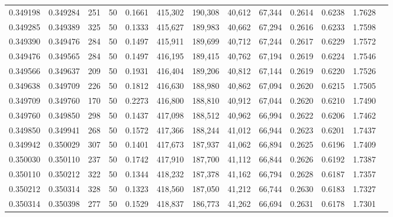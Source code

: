 \begin{tabular}{rrrrrrrrrrrrr}
0.349198 & 0.349284 &   251 &  50 &                                     0.1661 & 415,302 & 190,308 &  40,612 &  67,344 & 0.2614 & 0.6238 & 1.7628 \\
0.349285 & 0.349389 &   325 &  50 &                                     0.1333 & 415,627 & 189,983 &  40,662 &  67,294 & 0.2616 & 0.6233 & 1.7598 \\
0.349390 & 0.349476 &   284 &  50 &                                     0.1497 & 415,911 & 189,699 &  40,712 &  67,244 & 0.2617 & 0.6229 & 1.7572 \\
0.349476 & 0.349565 &   284 &  50 &                                     0.1497 & 416,195 & 189,415 &  40,762 &  67,194 & 0.2619 & 0.6224 & 1.7546 \\
0.349566 & 0.349637 &   209 &  50 &                                     0.1931 & 416,404 & 189,206 &  40,812 &  67,144 & 0.2619 & 0.6220 & 1.7526 \\
0.349638 & 0.349709 &   226 &  50 &                                     0.1812 & 416,630 & 188,980 &  40,862 &  67,094 & 0.2620 & 0.6215 & 1.7505 \\
0.349709 & 0.349760 &   170 &  50 &                                     0.2273 & 416,800 & 188,810 &  40,912 &  67,044 & 0.2620 & 0.6210 & 1.7490 \\
0.349760 & 0.349850 &   298 &  50 &                                     0.1437 & 417,098 & 188,512 &  40,962 &  66,994 & 0.2622 & 0.6206 & 1.7462 \\
0.349850 & 0.349941 &   268 &  50 &                                     0.1572 & 417,366 & 188,244 &  41,012 &  66,944 & 0.2623 & 0.6201 & 1.7437 \\
0.349942 & 0.350029 &   307 &  50 &                                     0.1401 & 417,673 & 187,937 &  41,062 &  66,894 & 0.2625 & 0.6196 & 1.7409 \\
0.350030 & 0.350110 &   237 &  50 &                                     0.1742 & 417,910 & 187,700 &  41,112 &  66,844 & 0.2626 & 0.6192 & 1.7387 \\
0.350110 & 0.350212 &   322 &  50 &                                     0.1344 & 418,232 & 187,378 &  41,162 &  66,794 & 0.2628 & 0.6187 & 1.7357 \\
0.350212 & 0.350314 &   328 &  50 &                                     0.1323 & 418,560 & 187,050 &  41,212 &  66,744 & 0.2630 & 0.6183 & 1.7327 \\
0.350314 & 0.350398 &   277 &  50 &                                     0.1529 & 418,837 & 186,773 &  41,262 &  66,694 & 0.2631 & 0.6178 & 1.7301 \\

\end{tabular}
